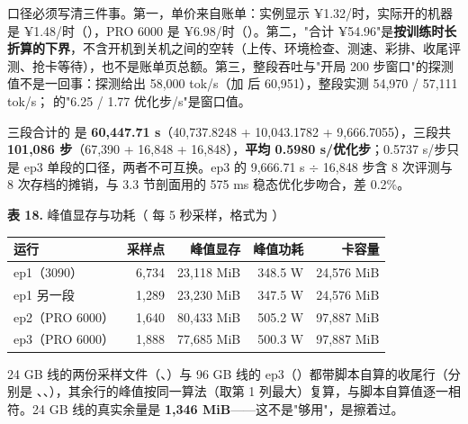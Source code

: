 \documentclass[11pt,openany]{ctexart}
\begin{document}
口径必须写清三件事。第一，单价来自账单：实例显示 ¥1.32/时，实际开的机器是 ¥1.48/时（），PRO 6000 是 ¥6.98/时（）。第二，"合计 ¥54.96"是\textbf{按训练时长折算的下界}，不含开机到关机之间的空转（上传、环境检查、测速、彩排、收尾评测、抢卡等待），也不是账单页总额。第三，整段吞吐与"开局 200 步窗口"的探测值不是一回事：探测给出 58,000 tok/s（加  后 60,951），整段实测 54,970 / 57,111 tok/s； 的"6.25 / 1.77 优化步/s"是窗口值。

三段合计的  是 \textbf{60,447.71 s}（40,737.8248 + 10,043.1782 + 9,666.7055），三段共 \textbf{101,086 步}（67,390 + 16,848 + 16,848），\textbf{平均 0.5980 s/优化步}；0.5737 s/步只是 ep3 单段的口径，两者不可互换。ep3 的 9,666.71 s $\div$ 16,848 步含 8 次评测与 8 次存档的摊销，与 3.3 节剖面用的 575 ms 稳态优化步吻合，差 0.2\allowbreak{}\%。

\noindent\textbf{表 18.} 峰值显存与功耗（ 每 5 秒采样，格式为 ）

\begin{center}
\small
\begin{tabular}{lrrrr}
\toprule
\textbf{运行} & \textbf{采样点} & \textbf{峰值显存} & \textbf{峰值功耗} & \textbf{卡容量} \\
\midrule
ep1（3090） & 6,734 & 23,118 MiB & 348.5 W & 24,576 MiB \\
ep1 另一段 & 1,289 & 23,230 MiB & 347.5 W & 24,576 MiB \\
ep2（PRO 6000） & 1,640 & 80,433 MiB & 505.2 W & 97,887 MiB \\
ep3（PRO 6000） & 1,888 & 77,685 MiB & 500.3 W & 97,887 MiB \\
\bottomrule
\end{tabular}
\end{center}

24 GB 线的两份采样文件（、）与 96 GB 线的 ep3（）都带脚本自算的收尾行（分别是 、、），其余行的峰值按同一算法（取第 1 列最大）复算，与脚本自算值逐一相符。24 GB 线的真实余量是 \textbf{1,346 MiB}——这不是"够用"，是擦着过。
\end{document}
